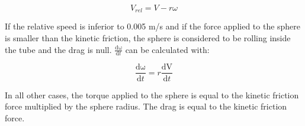 \documentclass[letterpaper, 10 pt, conference]{ieeeconf}  %
\begin{document}
\begin{equation}
V_{rel}=V-r\omega
\label{relV}
\end{equation}

 
If the relative speed is inferior to 0.005 m/s and if the force applied to the sphere is smaller than the kinetic friction, the sphere is considered to be rolling inside the tube and the drag is null. $\frac{\mathrm{d\omega } }{\mathrm{d} t}$ can be calculated with:

\begin{equation}
\frac{\mathrm{d\omega } }{\mathrm{d} t}=r\frac{\mathrm{dV } }{\mathrm{d} t}
\label{domega}
\end{equation}

In all other cases, the torque applied to the sphere is equal to the kinetic friction force multiplied by the sphere radius. The drag is equal to the kinetic friction force.



\end{document}
